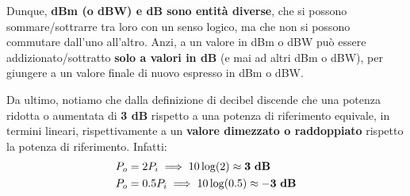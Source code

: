 \documentclass[openany,a4paper,12pt]{book}
\begin{document}
\begin{nota}[colback=PoliBlue!5, colframe=PoliBlue, title={\textbf{Regola fondamentale per i calcoli}}]
    Dunque, \textbf{dBm (o dBW) e dB sono entità diverse}, che si possono sommare/sottrarre tra loro con un senso logico, ma che non si possono commutare dall'uno all'altro. Anzi, a un valore in dBm o dBW può essere addizionato/sottratto \textbf{solo a valori in dB} (e mai ad altri dBm o dBW), per giungere a un valore finale di nuovo espresso in dBm o dBW.
\end{nota}

Da ultimo, notiamo che dalla definizione di decibel discende che una potenza ridotta o aumentata di \textbf{3 dB} rispetto a una potenza di riferimento equivale, in termini lineari, rispettivamente a un \textbf{valore dimezzato o raddoppiato} rispetto la potenza di riferimento. Infatti:
\begin{align*}
    P_o &= 2P_i \implies 10 \log(2) \approx \mathbf{3 \text{ \textbf{dB}}} \\
    P_o &= 0.5P_i \implies 10 \log(0.5) \approx \mathbf{-3 \text{ \textbf{dB}}}
\end{align*}
\end{document}
